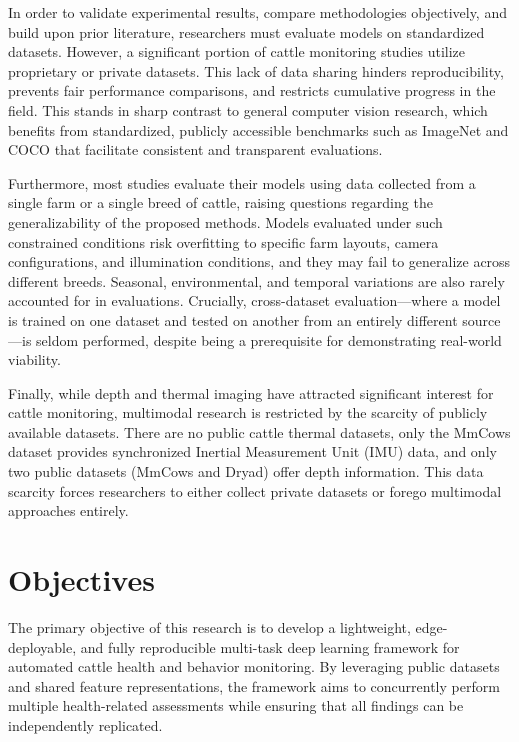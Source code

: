 In order to validate experimental results, compare methodologies objectively, and build upon prior literature, researchers must evaluate models on standardized datasets. However, a significant portion of cattle monitoring studies utilize proprietary or private datasets. This lack of data sharing hinders reproducibility, prevents fair performance comparisons, and restricts cumulative progress in the field. This stands in sharp contrast to general computer vision research, which benefits from standardized, publicly accessible benchmarks such as ImageNet and COCO that facilitate consistent and transparent evaluations.

Furthermore, most studies evaluate their models using data collected from a single farm or a single breed of cattle, raising questions regarding the generalizability of the proposed methods. Models evaluated under such constrained conditions risk overfitting to specific farm layouts, camera configurations, and illumination conditions, and they may fail to generalize across different breeds. Seasonal, environmental, and temporal variations are also rarely accounted for in evaluations. Crucially, cross-dataset evaluation---where a model is trained on one dataset and tested on another from an entirely different source---is seldom performed, despite being a prerequisite for demonstrating real-world viability.

Finally, while depth and thermal imaging have attracted significant interest for cattle monitoring, multimodal research is restricted by the scarcity of publicly available datasets. There are no public cattle thermal datasets, only the MmCows dataset provides synchronized Inertial Measurement Unit (IMU) data, and only two public datasets (MmCows and Dryad) offer depth information. This data scarcity forces researchers to either collect private datasets or forego multimodal approaches entirely.


\section{Objectives}

The primary objective of this research is to develop a lightweight, edge-deployable, and fully reproducible multi-task deep learning framework for automated cattle health and behavior monitoring. By leveraging public datasets and shared feature representations, the framework aims to concurrently perform multiple health-related assessments while ensuring that all findings can be independently replicated.


